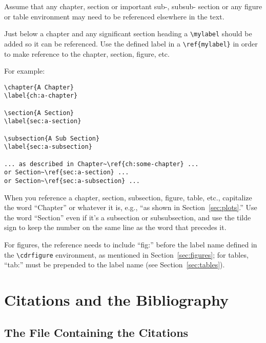 Assume that any chapter, section or important sub-, subsub- section
or any figure or table environment may need to be referenced
elsewhere in the text. 

Just below a chapter and any significant section heading a
\verb|\mylabel| should be added so it can be referenced. Use the defined label in a \verb|\ref{mylabel}| in order to make reference
to the chapter, section, figure, etc.

For example:

\begin{verbatim}
\chapter{A Chapter}
\label{ch:a-chapter}

\section{A Section}
\label{sec:a-section}

\subsection{A Sub Section}
\label{sec:a-subsection}

... as described in Chapter~\ref{ch:some-chapter} ... 
or Section~\ref{sec:a-section} ... 
or Section~\ref{sec:a-subsection} ...

\end{verbatim}


When you reference a chapter, section, subsection, figure, table,
etc., capitalize the word ``Chapter'' or whatever it is, e.g., ``as
shown in Section~\ref{sec:plots}.''
Use the word ``Section'' even if it's a subsection or subsubsection,
and use the tilde sign to keep the number on the same line as the word
that precedes it.

For figures, the reference needs to include ``fig:'' before the label name defined in the \verb|\cdrfigure| environment, as mentioned in Section~\ref{sec:figures}; for tables, ``tab:'' must be prepended to the label name (see Section~\ref{sec:tables}).


\section{Citations and the Bibliography}

\subsection{The File Containing the Citations}

